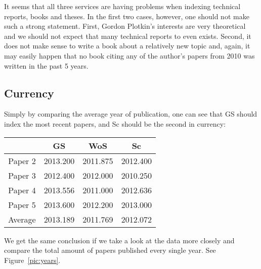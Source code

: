 \documentclass{lmcs}
\newenvironment{centeredData}{%
    \medskip%
    \begin{center}%
}{%
    \end{center}%
    \medskip%
}
\begin{document}
It seems that all three services are having problems when indexing technical reports, books and theses. In the first two cases, however, one should not make such a strong statement. First, Gordon Plotkin's interests are very theoretical and we should not expect that many technical reports to even exists. Second, it does not make sense to write a book about a relatively new topic and, again, it may easily happen that no book citing any of the author's papers from 2010 was written in the past 5 years.

\subsection{Currency}

Simply by comparing the average year of publication, one can see that GS should index the most recent papers, and Sc should be the second in currency:

\begin{centeredData}
\begin{tabular}{r|c c c}
         & GS &  WoS & Sc \\
\hline
Paper 2  & 2013.200 & 2011.875 & 2012.400 \\
Paper 3  & 2012.400 & 2012.000 & 2010.250 \\
Paper 4  & 2013.556 & 2011.000 & 2012.636 \\
Paper 5  & 2013.600 & 2012.200 & 2013.000 \\
\hline
Average  & 2013.189 & 2011.769 & 2012.072
\end{tabular}
\end{centeredData}

We get the same conclusion if we take a look at the data more closely and compare the total amount of papers published every single year. See Figure~\ref{pic:years}.
\end{document}

